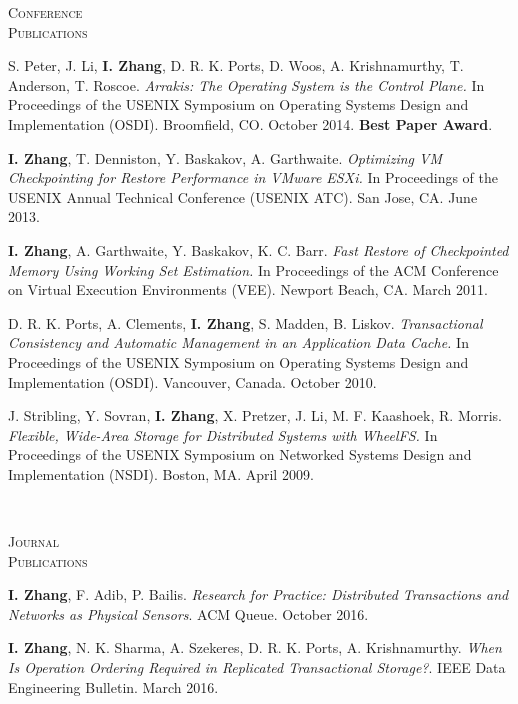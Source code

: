 \documentclass[10pt,minionpro]{report}
\newlength{\sectiongap}
\newlength{\sectioncolwidth}
\newlength{\colgap}
\newlength{\stuffwidth}
\newenvironment{rtable}{
  \begin{minipage}{\textwidth}
  }{
  \end{minipage}
}
\newenvironment{rsection}[1]{
  \begin{minipage}[t]{\sectioncolwidth}
    \textsc{#1}
  \end{minipage}
  \hspace{\colgap}
  \begin{minipage}[t]{\stuffwidth}
  }{
    \removelastskip
  \end{minipage}
  \\[\sectiongap]
}
\begin{document}
\begin{rtable}
\begin{rsection}{Conference\\Publications}
   S. Peter, J. Li, \textbf{I. Zhang}, D. R. K. Ports, D.  Woos,
   A. Krishnamurthy, T. Anderson, T. Roscoe.  \textit{Arrakis: The
     Operating System is the Control Plane.}  In Proceedings of the
   USENIX Symposium on Operating Systems Design and Implementation
   (OSDI).  Broomfield, CO. October 2014. \textbf{Best Paper
     Award}.\\\vspace{-0.5em}

   \textbf{I. Zhang}, T. Denniston, Y. Baskakov, A. Garthwaite.
   \textit{Optimizing VM Checkpointing for Restore Performance in
     VMware ESXi.}  In Proceedings of the USENIX Annual Technical
   Conference (USENIX ATC).  San Jose, CA. June 2013.\\\vspace{-0.5em}

   \textbf{I. Zhang}, A. Garthwaite, Y. Baskakov,
   K. C. Barr. \textit{Fast Restore of Checkpointed Memory Using
     Working Set Estimation.}  In Proceedings of the ACM Conference on
   Virtual Execution Environments (VEE). Newport Beach, CA. March
   2011.\\\vspace{-0.5em}

   D. R. K. Ports, A. Clements, \textbf{I. Zhang}, S. Madden,
   B. Liskov. \textit{Transactional Consistency and Automatic
     Management in an Application Data Cache.}  In Proceedings of the
   USENIX Symposium on Operating Systems Design and Implementation
   (OSDI). Vancouver, Canada. October 2010.\\\vspace{-0.5em}

   J. Stribling, Y. Sovran, \textbf{I. Zhang}, X. Pretzer, J. Li,
   M. F. Kaashoek, R. Morris. \textit{Flexible, Wide-Area Storage for
     Distributed Systems with WheelFS.}  In Proceedings of the USENIX
   Symposium on Networked Systems Design and
   Implementation (NSDI).  Boston, MA. April 2009.\\
  \end{rsection}

  \begin{rsection}{Journal\\Publications}
    \textbf{I. Zhang}, F. Adib, P. Bailis. \textit{Research for
      Practice: Distributed Transactions and Networks as Physical
      Sensors}. ACM Queue. October 2016.\\\vspace{-0.5em}

    \textbf{I. Zhang}, N. K. Sharma, A. Szekeres,
    D. R. K. Ports, A. Krishnamurthy. \textit{When Is Operation
      Ordering Required in Replicated Transactional Storage?}.  IEEE
    Data Engineering Bulletin. March 2016.\\\vspace{-0.5em}


\end{rsection}
\end{rtable}
\end{document}
